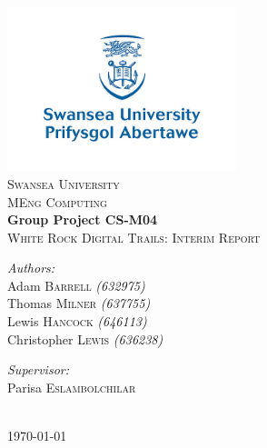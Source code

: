 \begin{titlepage}

\begin{center}
\includegraphics[width=0.5\textwidth]{img/University_Logo}\\

\textsc{\LARGE Swansea University }\\[0.5cm]
\textsc{\large MEng Computing }\\[2cm]

{ \huge \bfseries Group Project CS-M04}\\[0.2cm]
\textsc{\large White Rock Digital Trails: Interim Report}\\[1.5cm]

\begin{minipage}{0.4\textwidth}
\begin{flushleft}

\emph{Authors:}\\
Adam \textsc{Barrell} {\scriptsize \emph{(632975)}} \\
Thomas \textsc{Milner} {\scriptsize \emph{(637755)}} \\
Lewis \textsc{Hancock} {\scriptsize \emph{(646113)}} \\
Christopher \textsc{Lewis} {\scriptsize \emph{(636238)}} \\

\end{flushleft}
\end{minipage}
\begin{minipage}{0.4\textwidth}
\begin{flushright}

\emph{Supervisor:}\\
Parisa \textsc{Eslambolchilar}

\end{flushright}
\end{minipage}\\[1.3cm]

{\today}
\end{center}

\end{titlepage}